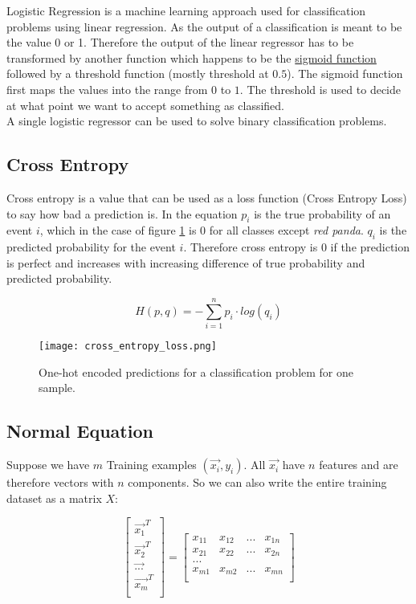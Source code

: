 Logistic Regression is a machine learning approach used for classification problems using linear regression. As the output of a classification is meant to be the value 0 or 1. Therefore the output of the linear regressor has to be transformed by another function which happens to be the \hyperref[sec:sec:fig:sigmoid]{sigmoid function} followed by a threshold function (mostly threshold at $0.5$). The sigmoid function first maps the values into the range from $0$ to $1$. The threshold is used to decide at what point we want to accept something as classified.\\

A single logistic regressor can be used to solve binary classification problems.

\subsection{Cross Entropy}

Cross entropy is a value that can be used as a loss function (Cross Entropy Loss) to say how bad a prediction is. In the equation $p_{i}$ is the true probability of an event $i$, which in the case of figure \ref{fig:cross_entropy_loss} is 0 for all classes except \textit{red panda}. $q_{i}$ is the predicted probability for the event $i$.
Therefore cross entropy is 0 if the prediction is perfect and increases with increasing difference of true probability and predicted probability.

$$
    H(p, q) = - \sum_{i=1}^{n} p_{i} \cdot log(q_{i})
$$

\begin{figure}[h]
    \centering
    \texttt{[image: cross\_entropy\_loss.png]}
    \caption{One-hot encoded predictions for a classification problem for one sample.}
    \label{fig:cross_entropy_loss}
\end{figure}

\subsection{Normal Equation}

Suppose we have $m$ Training examples $(\vec{x_{i}}, y_{i})$. All $\vec{x_{i}}$ have $n$ features and are therefore vectors with $n$ components. So we can also write the entire training dataset as a matrix $X$:

$$
    \begin{bmatrix}
        \vec{x_{1}}^{T} \\
        \vec{x_{2}}^{T} \\
        \vec{...  }     \\
        \vec{x_{m}}^{T} \\
    \end{bmatrix}
    =
    \begin{bmatrix}
        x_{11} & x_{12} & ... & x_{1n} \\
        x_{21} & x_{22} & ... & x_{2n} \\
        ...    &        &     &        \\
        x_{m1} & x_{m2} & ... & x_{mn} \\
    \end{bmatrix}
$$

